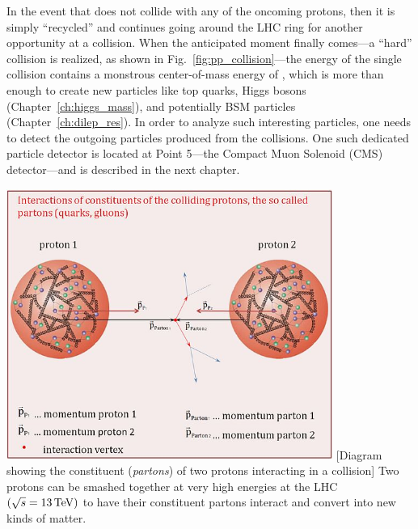 In the event that \pname does not collide with any of the oncoming protons, then it is simply ``recycled'' and continues going around the LHC ring for another opportunity at a \pp collision.
When the anticipated moment finally comes---\ie a ``hard'' \pp collision is realized, as shown in Fig.~\ref{fig:pp_collision}---the energy of the single collision contains a monstrous center-of-mass energy of \sqrtsthirteen, which is more than enough to create new particles like top quarks, Higgs bosons (Chapter~\ref{ch:higgs_mass}), and potentially BSM particles (Chapter~\ref{ch:dilep_res}).
In order to analyze such interesting particles, one needs to detect the outgoing particles produced from the \pp collisions.
One such dedicated particle detector is located at Point 5---the Compact Muon Solenoid (CMS) detector---and is described in the next chapter.
\begin{multiFigure}
    \centering
    \includegraphics[width=0.8\textwidth]{figures/lhc/proton_proton_quarksandgluons.jpg}
        [Diagram showing the constituent (\emph{partons}) of two protons interacting in a \pp collision]
        {Two protons can be smashed together at very high energies at the LHC $\left( \sqrt{s} = 13\,\text{Te\hspace{-.08em}V} \right)$ to have their constituent partons interact and convert into new kinds of matter.} 
    \label{fig:pp_collision}
\end{multiFigure}


